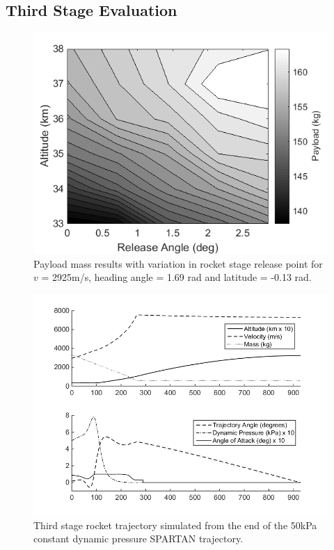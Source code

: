 \documentclass[]{aiaa-tc}
\begin{document}
\subsection{Third Stage Evaluation}
  \begin{figure}[H]
  	\begin{center}
  		\includegraphics[width=0.6\linewidth]{contours}
  		\caption{Payload mass results with variation in rocket stage release point for $v$ = 2925m/s, heading angle = 1.69 rad and latitude = -0.13 rad.}
  		\label{fig:contours}
  	\end{center}
  \end{figure}
  \begin{figure}[ht]
  	\centering
  	\includegraphics[width=0.8\linewidth]{ThirdStageConstQ}
  	\caption{Third stage rocket trajectory simulated from the end of the 50kPa constant dynamic pressure SPARTAN trajectory.}
  	\label{fig:ThirdStageConstQ}
  \end{figure}
\end{document}
